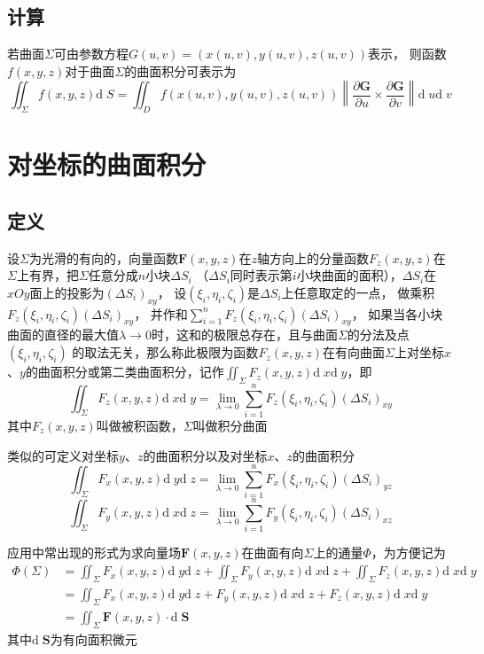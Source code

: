 \documentclass[UTF8]{ctexart}
\newcommand{\cross}{\times}
\newcommand{\dif}[1]{{\mathrm{d}\;\!#1}}
\newcommand{\ve}[1]{{\bm{#1}}}
\newcommand{\norm}[1]{{\left\|#1\right\|}}
\newcommand{\emplin}{\vspace{1em}}
\begin{document}
\subsection*{计算}
若曲面$\Sigma$可由参数方程$G(u,v)=\left( x(u,v),y(u,v),z(u,v) \right)$表示，
则函数$f(x,y,z)$对于曲面$\Sigma$的曲面积分可表示为
\[\iint_\Sigma f(x,y,z)\dif{S}=\iint_D f(x(u,v),y(u,v),z(u,v))\norm{\frac{\partial \ve{G}}{\partial u}\cross\frac{\partial \ve{G}}{\partial v}}\dif{u}\dif{v}\]


\section*{对坐标的曲面积分}
\subsection*{定义}
设$\Sigma$为光滑的有向的，向量函数$\ve{F}(x,y,z)$在$z$轴方向上的分量函数${F}_z(x,y,z)$在$\Sigma$上有界，把$\Sigma$任意分成$n$小块$\Delta S_i$
（$\Delta S_i$同时表示第$i$小块曲面的面积），$\Delta S_i$在$xOy$面上的投影为$(\Delta S_i)_{xy}$，
设$(\xi_i,\eta_i,\zeta_i)$是$\Delta S_i$上任意取定的一点，
做乘积${F}_z(\xi_i,\eta_i,\zeta_i)(\Delta S_i)_{xy}$，
并作和$\sum^n_{i=1}{F}_z(\xi_i,\eta_i,\zeta_i)(\Delta S_i)_{xy}$，
如果当各小块曲面的直径的最大值$\lambda\to0$时，这和的极限总存在，且与曲面$\Sigma$的分法及点$(\xi_i,\eta_i,\zeta_i)$
的取法无关，那么称此极限为函数${F}_z(x,y,z)$在有向曲面$\Sigma$上对坐标$x$、$y$的曲面积分或第二类曲面积分，记作$\iint_\Sigma {F}_z(x,y,z)\dif{x}\dif{y}$，即
\[\iint_\Sigma {F}_z(x,y,z)\dif{x}\dif{y}=\lim_{\lambda\to0}\sum^n_{i=1}{F}_z(\xi_i,\eta_i,\zeta_i)(\Delta S_i)_{xy}\]
其中${F}_z(x,y,z)$叫做被积函数，$\Sigma$叫做积分曲面

\emplin

类似的可定义对坐标$y$、$z$的曲面积分以及对坐标$x$、$z$的曲面积分
\[\iint_\Sigma {F}_x(x,y,z)\dif{y}\dif{z}=\lim_{\lambda\to0}\sum^n_{i=1}{F}_x(\xi_i,\eta_i,\zeta_i)(\Delta S_i)_{yz}\]
\[\iint_\Sigma {F}_y(x,y,z)\dif{x}\dif{z}=\lim_{\lambda\to0}\sum^n_{i=1}{F}_y(\xi_i,\eta_i,\zeta_i)(\Delta S_i)_{xz}\]

\emplin

应用中常出现的形式为求向量场$\ve{F}(x,y,z)$在曲面有向$\Sigma$上的通量$\Phi$，为方便记为
\begin{align*}
\Phi(\Sigma)&=\iint_\Sigma {F}_x(x,y,z)\dif{y}\dif{z}+\iint_\Sigma {F}_y(x,y,z)\dif{x}\dif{z}+\iint_\Sigma {F}_z(x,y,z)\dif{x}\dif{y}\\
&=\iint_\Sigma{F}_x(x,y,z)\dif{y}\dif{z}+{F}_y(x,y,z)\dif{x}\dif{z}+{F}_z(x,y,z)\dif{x}\dif{y}\\
&=\iint_\Sigma \ve{F}(x,y,z)\cdot\dif{\ve{S}}
\end{align*}
其中$\dif{\ve{S}}$为有向面积微元
\end{document}
